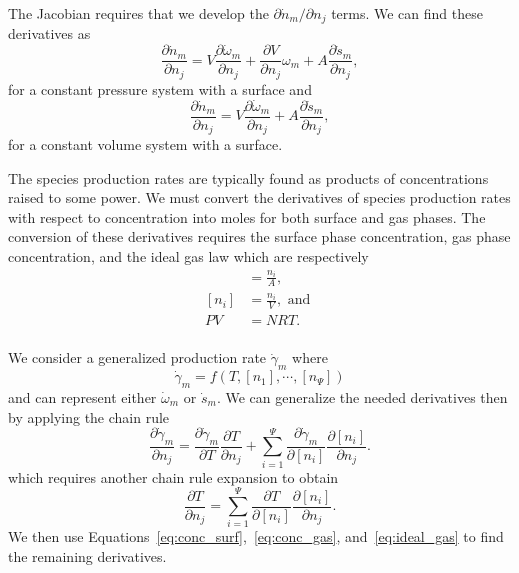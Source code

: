 \documentclass{article}
\def\nspecies{\Psi}
\begin{document}
The Jacobian requires that we develop the $\partial \dot{n}_{m}/\partial n_j$ terms.
We can find these derivatives as
\begin{equation}
        \frac{\partial \dot{n}_{m}}{\partial n_j} = V\frac{\partial \dot{\omega}_{m}}{\partial n_j} + \frac{\partial V}{\partial n_j}\omega_{m}+ A\frac{\partial \dot{s}_{m}}{\partial n_j},
\end{equation}
for a constant pressure system with a surface and
\begin{equation}
    \frac{\partial \dot{n}_{m}}{\partial n_j} = V\frac{\partial \dot{\omega}_{m}}{\partial n_j} + A\frac{\partial \dot{s}_{m}}{\partial n_j},
\end{equation}
for a constant volume system with a surface.

The species production rates are typically found as products of concentrations raised to some power.
We must convert the derivatives of species production rates with respect to concentration into moles for both surface and gas phases.
The conversion of these derivatives requires the surface phase concentration, gas phase concentration, and the ideal gas law which are respectively
\begin{align}
    [n_i] &= \frac{n_i}{A},\label{eq:conc_surf}\\
    [n_i] &= \frac{n_i}{V}, \text{ and }\label{eq:conc_gas}\\
    P V &= N R T.\label{eq:ideal_gas}\\
\end{align}

We consider a generalized production rate $\dot{\gamma}_m$ where
\begin{equation}
    \dot{\gamma}_m = f(T, [n_1], \cdots, [n_\nspecies])
\end{equation}
and can represent either $\dot{\omega}_m$ or $\dot{s}_m$.
We can generalize the needed derivatives then by applying the chain rule
\begin{equation}
    \label{eq:gen_deriv}
    \frac{\partial \dot{\gamma}_m}{\partial n_j} = \frac{\partial \dot{\gamma}_m}{\partial T}\frac{\partial T}{\partial n_j} + \sum_{i=1}^{\nspecies}{\frac{\partial \dot{\gamma}_m}{\partial [n_i]}\frac{\partial[n_i]}{\partial n_j}}.
\end{equation}
which requires another chain rule expansion to obtain
\begin{equation}
    \frac{\partial T}{\partial n_j} = \sum_{i=1}^{\nspecies}{\frac{\partial T}{\partial [n_i]}\frac{\partial [n_i]}{\partial n_j}}.
\end{equation}
We then use Equations~\ref{eq:conc_surf},~\ref{eq:conc_gas}, and~\ref{eq:ideal_gas} to find the remaining derivatives.
\end{document}
